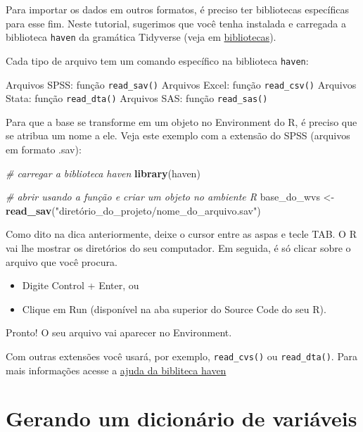 \documentclass[
  10pt,
  brazil,
  a4paper,
  twoside, notitlepage, openright]{book}
\newenvironment{Shaded}{\begin{snugshade}}{\end{snugshade}}
\newcommand{\CommentTok}[1]{\textcolor[rgb]{0.56,0.35,0.01}{\textit{#1}}}
\newcommand{\KeywordTok}[1]{\textcolor[rgb]{0.13,0.29,0.53}{\textbf{#1}}}
\newcommand{\NormalTok}[1]{#1}
\newcommand{\StringTok}[1]{\textcolor[rgb]{0.31,0.60,0.02}{#1}}
\providecommand{\tightlist}{%
  \setlength{\itemsep}{0pt}\setlength{\parskip}{0pt}}
\begin{document}
Para importar os dados em outros formatos, é preciso ter bibliotecas específicas para esse fim. Neste tutorial, sugerimos que você tenha instalada e carregada a biblioteca \texttt{haven} da gramática Tidyverse (veja em \protect\hyperlink{biblio}{bibliotecas}).

Cada tipo de arquivo tem um comando específico na biblioteca \texttt{haven}:

Arquivos SPSS: função \texttt{read\_sav()}
Arquivos Excel: função \texttt{read\_csv()}
Arquivos Stata: função \texttt{read\_dta()}
Arquivos SAS: função \texttt{read\_sas()}

Para que a base se transforme em um objeto no Environment do R, é preciso que se atribua um nome a ele. Veja este exemplo com a extensão do SPSS (arquivos em formato .sav):

\begin{Shaded}
\begin{Highlighting}[]
\CommentTok{# carregar a biblioteca haven}
\KeywordTok{library}\NormalTok{(haven)}

\CommentTok{# abrir usando a função e criar um objeto no ambiente R}
\NormalTok{base_do_wvs <-}\StringTok{ }\KeywordTok{read_sav}\NormalTok{(}\StringTok{"diretório_do_projeto/nome_do_arquivo.sav"}\NormalTok{)}
\end{Highlighting}
\end{Shaded}

Como dito na dica anteriormente, deixe o cursor entre as aspas e tecle TAB. O R vai lhe mostrar os diretórios do seu computador. Em seguida, é só clicar sobre o arquivo que você procura.

\begin{itemize}
\tightlist
\item
  Digite Control + Enter, ou
\item
  Clique em Run (disponível na aba superior do Source Code do seu R).
\end{itemize}

Pronto! O seu arquivo vai aparecer no Environment.

Com outras extensões você usará, por exemplo, \texttt{read\_cvs()} ou \texttt{read\_dta()}. Para mais informações acesse a \href{https://haven.tidyverse.org/}{ajuda da bibliteca haven}

\hypertarget{gerando-um-dicionuxe1rio-de-variuxe1veis}{%
\section{Gerando um dicionário de variáveis}\label{gerando-um-dicionuxe1rio-de-variuxe1veis}}
\end{document}
